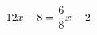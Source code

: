 \documentclass[preview]{standalone}
\begin{document}
\begin{align*}
\special{dvisvgm:raw <g id='unique000'>}12x - 8 = \frac{6}{8}x - 2\special{dvisvgm:raw </g>}
\end{align*}
\end{document}
